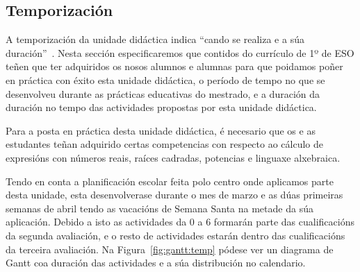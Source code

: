 \subsection{Temporización}
A temporización da unidade didáctica indica ``cando se realiza e a súa duración''~\cite{delvalleud}. Nesta sección especificaremos que contidos do currículo de 1º de ESO teñen que ter adquiridos os nosos alumnos e alumnas para que poidamos poñer en práctica con éxito esta unidade didáctica, o período de tempo no que se desenvolveu durante as prácticas educativas do mestrado, e a duración da duración no tempo das actividades propostas por esta unidade didáctica.

Para a posta en práctica desta unidade didáctica, é necesario que os e as estudantes teñan adquirido certas competencias con respecto ao cálculo de expresións con números reais, raíces cadradas, potencias e linguaxe alxebraica.

Tendo en conta a planificación escolar feita polo centro onde aplicamos parte desta unidade, esta desenvolverase durante o mes de marzo e as dúas primeiras semanas de abril tendo as vacacións de Semana Santa na metade da súa aplicación. Debido a isto as actividades da 0 a 6 formarán parte das cualificacións da segunda avaliación, e o resto de actividades estarán dentro das cualificacións da terceira avaliación. Na Figura~\ref{fig:gantt:temp} pódese ver un diagrama de Gantt coa duración das actividades e a súa distribución no calendario.

